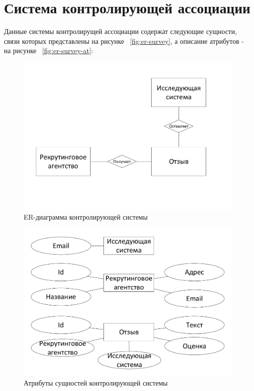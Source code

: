 \section{Система контролирующей ассоциации}
Данные системы контролирущей ассоциации содержат следующие сущности, связи которых представлены на рисунке ~\ref{fig:er-survey}, а описание атрибутов - на рисунке ~\ref{fig:er-survey-at}:

\begin{figure}[ht]
  \centering
  \includegraphics[width=\textwidth]{include/er-supervising.pdf}
\caption{ER-диаграмма контролирующей системы}
\label{fig:er-supervising}
\end{figure}

\begin{figure}[ht]
  \centering
  \includegraphics[width=\textwidth]{include/er-supervising-at.pdf}
\caption{Атрибуты сущностей контролирующей системы}
\label{fig:er-supervising-at}
\end{figure}

